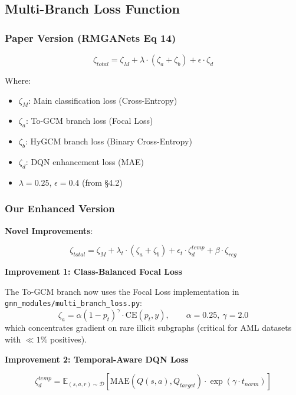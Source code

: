 \documentclass[11pt,a4paper]{article}
\begin{document}
\subsection{Multi-Branch Loss Function}

\subsubsection{Paper Version (RMGANets Eq 14)}

\begin{equation}
\zeta_{total} = \zeta_M + \lambda \cdot (\zeta_a + \zeta_b) + \epsilon \cdot \zeta_d
\end{equation}

Where:
\begin{itemize}
    \item $\zeta_M$: Main classification loss (Cross-Entropy)
    \item $\zeta_a$: To-GCM branch loss (Focal Loss)
    \item $\zeta_b$: HyGCM branch loss (Binary Cross-Entropy)
    \item $\zeta_d$: DQN enhancement loss (MAE)
    \item $\lambda = 0.25$, $\epsilon = 0.4$ (from §4.2)
\end{itemize}

\subsubsection{Our Enhanced Version}

\textbf{Novel Improvements}:

\begin{equation}
\zeta_{total} = \zeta_M + \lambda_t \cdot (\zeta_a + \zeta_b) + \epsilon_t \cdot \zeta_{d}^{temp} + \beta \cdot \zeta_{reg}
\end{equation}

\textbf{Improvement 1: Class-Balanced Focal Loss}

The To-GCM branch now uses the Focal Loss implementation in \texttt{gnn\_modules/multi\_branch\_loss.py}:
\begin{equation}
\zeta_a = \alpha (1 - p_t)^\gamma \cdot \text{CE}(p_t, y), \qquad \alpha=0.25,\ \gamma=2.0
\end{equation}
which concentrates gradient on rare illicit subgraphs (critical for AML datasets with $\ll1\%$ positives).

\textbf{Improvement 2: Temporal-Aware DQN Loss}

\begin{equation}
\zeta_{d}^{temp} = \mathbb{E}_{(s,a,r) \sim \mathcal{D}}\left[\text{MAE}(Q(s,a), Q_{target}) \cdot \exp(\gamma \cdot t_{norm})\right]
\end{equation}
\end{document}
